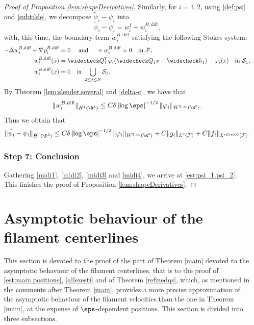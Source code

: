 \begin{proof}[Proof of Proposition \ref{lem:shapeDerivatives}]
Similarly, for $i=1,2$, using \eqref{def:psi} and \eqref{subtilde}, we decompose $\tilde \psi_i - \psi_i$ into
\[
\tilde \psi_i - \psi_i = w_i^I + w_i^{B,\textrm{diff}},\]
with, this time, the boundary term $w_i^{B,\textrm{diff}}$ satisfying the following Stokes system:
\begin{align*}
- \Delta w_i^{B,\textrm{diff}} + \nabla p_i^{B,\textrm{diff}} &= 0 \quad \text{ and } \quad\div w_i^{B,\textrm{diff}} = 0 \quad \text{in } \mathcal F, \\
w_i^{B,\textrm{diff}}(x) &= \widecheck Q_1^T \varphi_i(\widecheck Q_1 x + \widecheck h_1) - \varphi_i(x) \quad \text{in } \mathcal S_1, \\
w_i^{B,\textrm{diff}}(x) &= 0 \quad \text{in } \bigcup_{2 \leq j \leq N} \mathcal S_j.
\end{align*}
By Theorem \ref{lem:slender.several} and \eqref{delta-c},
we have that
\begin{equation*}
\|w_i^{B,\textrm{diff}}\|_{\dot H^1(\R^3)} \leq C \delta \left|\log \eps\right|^{-1/2} \| \varphi_i\|_{W^{2,\infty} (\R^3)}.
\end{equation*}
Thus
we obtain that
\begin{equation}
\label{midi3}
\|\tilde \psi_i - \psi_i\|_{\dot H^1(\R^3)} \leq C \delta \left|\log \eps\right|^{-1/2}\| \varphi_i\|_{W^{2,\infty} (\R^3)} + C \|g_i\|_{L^2 (\mathcal F)} + C \|f_i\|_{L^{\sfrac 6 5 } (\mathcal F)}.
\end{equation}

\subsubsection*{Step 7: Conclusion} Gathering \eqref{midi1}, \eqref{midi2},
\eqref{midi3} and \eqref{midi4}, we arrive at \eqref{est:psi_1.psi_2}.
This finishes the proof of Proposition \ref{lem:shapeDerivatives}.
\end{proof}

\section{Asymptotic behaviour of the filament centerlines}
\label{gathered-section}
This section is devoted to the proof of the part of Theorem \ref{main} devoted to the asymptotic behaviour of the filament centerlines, that is to the proof of
\eqref{est:main.positions},
\eqref{allezesti} and of
Theorem \ref{refinedqs}, which, as mentioned in the comments after Theorem \ref{main},
provides a more precise approximation of the asymptotic behaviour of the filament velocities than the one in Theorem \ref{main}, at the expense of $\eps$-dependent positions.
This section is divided into three subsections.

